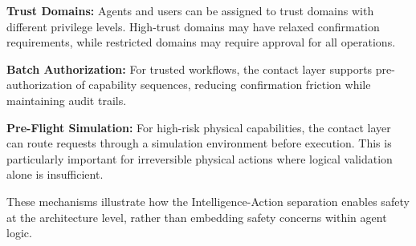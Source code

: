 \textbf{Trust Domains:} Agents and users can be assigned to trust domains with different privilege levels. High-trust domains may have relaxed confirmation requirements, while restricted domains may require approval for all operations.

\textbf{Batch Authorization:} For trusted workflows, the contact layer supports pre-authorization of capability sequences, reducing confirmation friction while maintaining audit trails.

\textbf{Pre-Flight Simulation:} For high-risk physical capabilities, the contact layer can route requests through a simulation environment before execution. This is particularly important for irreversible physical actions where logical validation alone is insufficient.

These mechanisms illustrate how the Intelligence-Action separation enables safety at the architecture level, rather than embedding safety concerns within agent logic.
